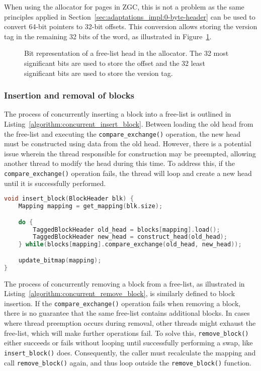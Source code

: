 When using the allocator for pages in ZGC, this is not a problem as the same principles applied in Section~\ref{sec:adaptations_impl:0-byte-header} can be used to convert 64-bit pointers to 32-bit offsets. This conversion allows storing the version tag in the remaining 32 bits of the word, as illustrated in Figure~\ref{fig:concurrent_head_bits}.

\begin{figure}[H]
    \centering
    \vspace*{4mm}
    
    \caption{Bit representation of a free-list head in the allocator. The 32 most significant bits are used to store the offset and the 32 least significant bits are used to store the version tag.}
    \label{fig:concurrent_head_bits}
\end{figure}

\subsubsection{Insertion and removal of blocks}

The process of concurrently inserting a block into a free-list is outlined in Listing~\ref{algorithm:concurrent_insert_block}. Between loading the old head from the free-list and executing the \texttt{compare\_exchange()} operation, the new head must be constructed using data from the old head. However, there is a potential issue wherein the thread responsible for construction may be preempted, allowing another thread to modify the head during this time. To address this, if the \texttt{compare\_exchange()} operation fails, the thread will loop and create a new head until it is successfully performed.

\begin{lstlisting}[language=C++, caption={Concurrent insertion of a lock into the head of a free-list.}, label={algorithm:concurrent_insert_block}]
void insert_block(BlockHeader blk) {
    Mapping mapping = get_mapping(blk.size);

    do {
        TaggedBlockHeader old_head = blocks[mapping].load();
        TaggedBlockHeader new_head = construct_head(old_head);
    } while(blocks[mapping].compare_exchange(old_head, new_head));

    update_bitmap(mapping);
}
\end{lstlisting}

The process of concurrently removing a block from a free-list, as illustrated in Listing~\ref{algorithm:concurrent_remove_block}, is similarly defined to block insertion. If the \texttt{compare\_exchange()} operation fails when removing a block, there is no guarantee that the same free-list contains additional blocks. In cases where thread preemption occurs during removal, other threads might exhaust the free-list, which will make further operations fail. To solve this, \texttt{remove\_block()} either succeeds or fails without looping until successfully performing a swap, like \texttt{insert\_block()} does. Consequently, the caller must recalculate the mapping and call \texttt{remove\_block()} again, and thus loop outside the \texttt{remove\_block()} function.

